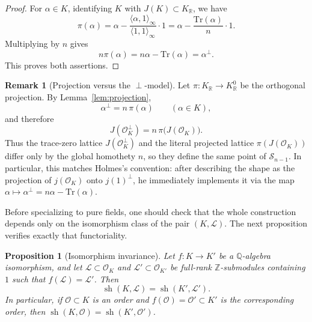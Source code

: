 \documentclass[11pt,letterpaper]{amsart}
\newcommand{\Q}{\mathbb{Q}}
\newcommand{\Z}{\mathbb{Z}}
\newcommand{\R}{\mathbb{R}}
\newcommand{\cO}{\mathcal{O}}
\newcommand{\Tr}{\mathrm{Tr}}
\theoremstyle{plain}
\newtheorem{proposition}[theorem]{Proposition}
\theoremstyle{definition}
\newtheorem{remark}[theorem]{Remark}
\begin{document}
\begin{proof}
For $\alpha\in K$, identifying $K$ with $J(K)\subset K_\R$, we have
\[
\pi(\alpha)=\alpha-\frac{\langle \alpha,1\rangle_\infty}{\langle 1,1\rangle_\infty}\cdot 1
=\alpha-\frac{\Tr(\alpha)}{n}\cdot 1.
\]
Multiplying by $n$ gives
\[
n\pi(\alpha)=n\alpha-\Tr(\alpha)=\alpha^\perp.
\]
This proves both assertions.
\end{proof}

\begin{remark}[Projection versus the \(\perp\)-model]
\label{rem:projection-versus-perp}
Let \(\pi:K_\R\to K_\R^0\) be the orthogonal projection.
By Lemma~\ref{lem:projection},
\[
\alpha^\perp=n\,\pi(\alpha)\qquad(\alpha\in K),
\]
and therefore
\[
J(\cO_K^\perp)=n\,\pi\bigl(J(\cO_K)\bigr).
\]
Thus the trace-zero lattice \(J(\cO_K^\perp)\) and the literal projected
lattice \(\pi(J(\cO_K))\) differ only by the global homothety \(n\), so they
define the same point of \(\mathscr S_{n-1}\).
In particular, this matches Holmes's convention: after describing the shape as
the projection of \(j(\cO_K)\) onto \(j(1)^\perp\), he immediately implements
it via the map \(\alpha\mapsto \alpha^\perp=n\alpha-\Tr(\alpha)\).
\end{remark}

Before specializing to pure fields, one should check that the whole construction depends only on the isomorphism class of the pair \((K,\mathcal L)\). The next proposition verifies exactly that functoriality.

\begin{proposition}[Isomorphism invariance]\label{prop:iso-invariance}
Let $f:K\to K'$ be a $\Q$-algebra isomorphism, and let $\mathcal L\subset \cO_K$ and $\mathcal L'\subset \cO_{K'}$
be full-rank $\Z$-submodules containing $1$ such that $f(\mathcal L)=\mathcal L'$.
Then
\[
\operatorname{sh}(K,\mathcal L)=\operatorname{sh}(K',\mathcal L').
\]
In particular, if $\cO\subset K$ is an order and $f(\cO)=\cO'\subset K'$ is the corresponding order, then
$\operatorname{sh}(K,\cO)=\operatorname{sh}(K',\cO')$.
\end{proposition}
\end{document}
